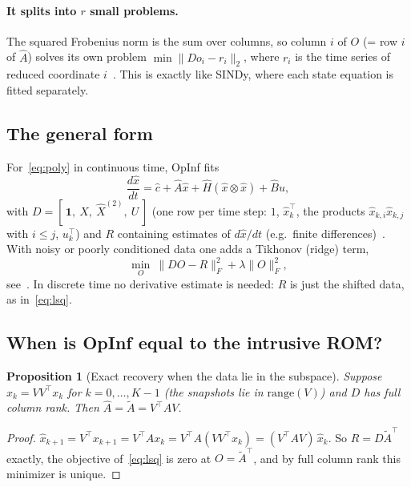 \documentclass[11pt]{article}
\newtheorem{proposition}{Proposition}
\theoremstyle{remark}\newtheorem{remark}{Remark}
\newcommand{\xh}{\hat{x}}
\newcommand{\Ah}{\hat{A}}
\newcommand{\At}{\tilde{A}}
\begin{document}
\paragraph{It splits into $r$ small problems.} The squared Frobenius norm is the sum over columns, so column $i$ of $O$ (= row $i$ of $\Ah$) solves its own problem $\min\|Do_i-r_i\|_2$, where $r_i$ is the time series of reduced coordinate $i$~\cite[eq.~(20)]{PW16}. This is exactly like SINDy, where each state equation is fitted separately.

\subsection{The general form}\label{sec:general}
For~\eqref{eq:poly} in continuous time, OpInf fits
\[
\frac{d\xh}{dt}=\hat c+\Ah\xh+\hat H(\xh\otimes\xh)+\hat Bu,
\]
with $D=[\,\mathbf 1,\ \hat X,\ \hat X^{(2)},\ U\,]$ (one row per time step: $1$, $\xh_k^\top$, the products $\xh_{k,i}\xh_{k,j}$ with $i\le j$, $u_k^\top$) and $R$ containing estimates of $d\xh/dt$ (e.g.\ finite differences)~\cite[Sec.~3.2]{PW16}. With noisy or poorly conditioned data one adds a Tikhonov (ridge) term,
\[
\min_O\ \|DO-R\|_F^2+\lambda\|O\|_F^2 ,
\]
see~\cite{KPW24}. In discrete time no derivative estimate is needed: $R$ is just the shifted data, as in~\eqref{eq:lsq}.

\subsection{When is OpInf equal to the intrusive ROM?}\label{sec:equal}
\begin{proposition}[Exact recovery when the data lie in the subspace]\label{prop:exact}
Suppose $x_k=VV^\top x_k$ for $k=0,\dots,K-1$ (the snapshots lie in $\mathrm{range}(V)$) and $D$ has full column rank. Then $\Ah=\At=V^\top AV$.
\end{proposition}
\begin{proof}
$\xh_{k+1}=V^\top x_{k+1}=V^\top Ax_k=V^\top A(VV^\top x_k)=(V^\top AV)\,\xh_k$. So $R=D\At^\top$ exactly, the objective of~\eqref{eq:lsq} is zero at $O=\At^\top$, and by full column rank this minimizer is unique.
\end{proof}
\end{document}
